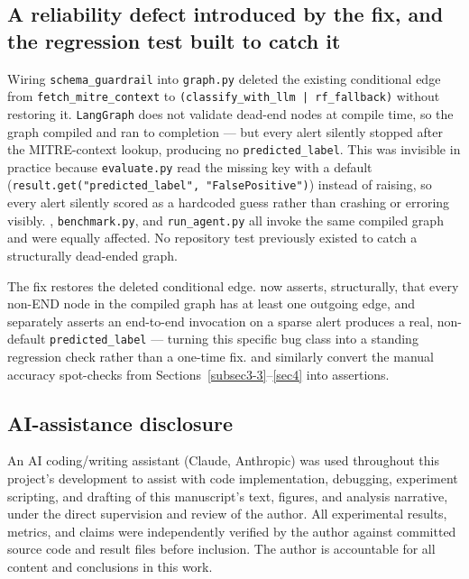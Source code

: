 \documentclass[twocolumn]{svjour3}
\begin{document}
\subsection{A reliability defect introduced by the fix, and the regression test built to catch it}\label{subsec3-4}
Wiring \texttt{schema\_guardrail} into \texttt{graph.py} deleted the existing conditional edge from \texttt{fetch\_mitre\_context} to \texttt{(classify\_with\_llm | rf\_fallback)} without restoring it. \texttt{LangGraph} does not validate dead-end nodes at compile time, so the graph compiled and ran to completion --- but every alert silently stopped after the MITRE-context lookup, producing no \texttt{predicted\_label}. This was invisible in practice because \texttt{evaluate.py} read the missing key with a default (\texttt{result.get("predicted\_label", "FalsePositive")}) instead of raising, so every alert silently scored as a hardcoded guess rather than crashing or erroring visibly. , \texttt{benchmark.py}, and \texttt{run\_agent.py} all invoke the same compiled graph and were equally affected. No repository test previously existed to catch a structurally dead-ended graph.

The fix restores the deleted conditional edge.  now asserts, structurally, that every non-END node in the compiled graph has at least one outgoing edge, and separately asserts an end-to-end invocation on a sparse alert produces a real, non-default \texttt{predicted\_label} --- turning this specific bug class into a standing regression check rather than a one-time fix.  and  similarly convert the manual accuracy spot-checks from Sections~\ref{subsec3-3}--\ref{sec4} into assertions.

\subsection{AI-assistance disclosure}\label{subsec3-5}
An AI coding/writing assistant (Claude, Anthropic) was used throughout this project's development to assist with code implementation, debugging, experiment scripting, and drafting of this manuscript's text, figures, and analysis narrative, under the direct supervision and review of the author. All experimental results, metrics, and claims were independently verified by the author against committed source code and result files before inclusion. The author is accountable for all content and conclusions in this work.
\end{document}
